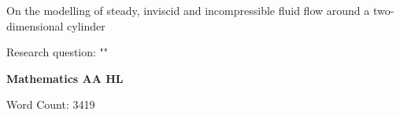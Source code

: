 \begin{titlepage}
	\begin{center}
		\vspace*{2cm}
		\Large On the modelling of steady, inviscid and incompressible fluid flow around a two-dimensional cylinder

		\vspace{1.5cm}
		\normalsize Research question: "\textbf{\researchquestion}"

		\vspace{1.5cm}
		\large\textbf{Mathematics AA HL}

		\vfill
		\color{darkgray} Word Count: 3419
	\end{center}
\end{titlepage}

\tableofcontents\newpage